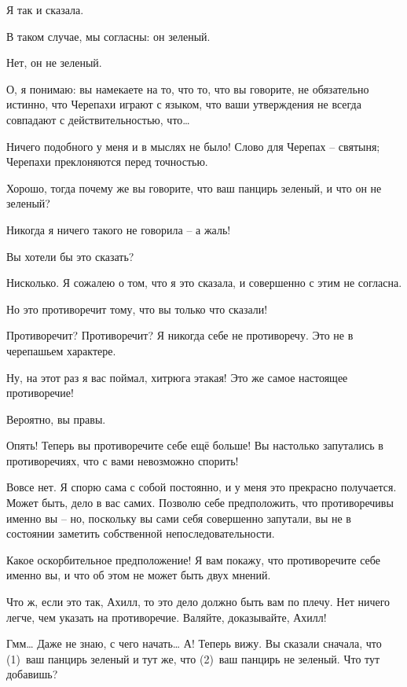 \documentclass[../main.tex]{subfiles}
\begin{document}
\begin{Dialogue}
 Я так и сказала.

 В таком случае, мы согласны: он зеленый.

 Нет, он не зеленый.

 О, я понимаю: вы намекаете на то, что то, что вы говорите, не обязательно истинно, что Черепахи играют с языком, что ваши утверждения не всегда совпадают с действительностью, что\ldots{}

 Ничего подобного у меня и в мыслях не было! Слово для Черепах \--- святыня; Черепахи преклоняются перед точностью.

 Хорошо, тогда почему же вы говорите, что ваш панцирь зеленый, и что он не зеленый?

 Никогда я ничего такого не говорила \--- а жаль!

 Вы хотели бы это сказать?

 Нисколько. Я сожалею о том, что я это сказала, и совершенно с этим не согласна.

 Но это противоречит тому, что вы только что сказали!

 Противоречит? Противоречит? Я никогда себе не противоречу. Это не в черепашьем характере.

 Ну, на этот раз я вас поймал, хитрюга этакая! Это же самое настоящее противоречие!

 Вероятно, вы правы.

 Опять! Теперь вы противоречите себе ещё больше! Вы настолько запутались в противоречиях, что с вами невозможно спорить!

 Вовсе нет. Я спорю сама с собой постоянно, и у меня это прекрасно получается. Может быть, дело в вас самих. Позволю себе предположить, что противоречивы именно вы \--- но, поскольку вы сами себя совершенно запутали, вы не в состоянии заметить собственной непоследовательности.

 Какое оскорбительное предположение! Я вам покажу, что противоречите себе именно вы, и что об этом не может быть двух мнений.

 Что ж, если это так, Ахилл, то это дело должно быть вам по плечу. Нет ничего легче, чем указать на противоречие. Валяйте, доказывайте, Ахилл!

 Гмм\ldots{} Даже не знаю, с чего начать\ldots{} А! Теперь вижу. Вы сказали сначала, что (1)~ваш панцирь зеленый и тут же, что (2)~ваш панцирь не зеленый. Что тут добавишь?


\end{Dialogue}
\end{document}
